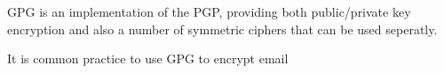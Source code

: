 GPG is an implementation of the PGP, providing both public/private key
encryption and also a number of symmetric ciphers that can be used seperatly.

It is common practice to use GPG to encrypt email
